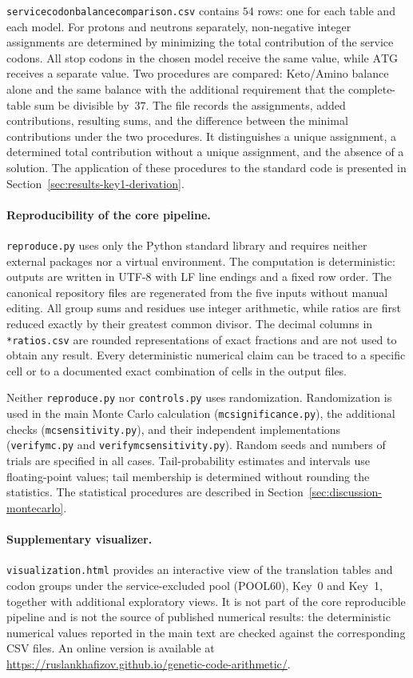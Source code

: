 \documentclass[11pt,a4paper]{article}
\renewcommand{\_}{\origunderscore\allowbreak}
\begin{document}
\texttt{service\_codon\_balance\_comparison.csv} contains
$54$ rows: one for each table and each model.
For protons and neutrons separately, non-negative integer
assignments are determined by minimizing the total
contribution of the service codons. All stop codons
in the chosen model receive the same value,
while $\mathrm{ATG}$ receives a separate value.
Two procedures are compared: Keto/Amino balance alone
and the same balance with the additional requirement
that the complete-table sum be divisible by~$37$.
The file records the assignments, added contributions,
resulting sums, and the difference between the minimal
contributions under the two procedures. It distinguishes
a unique assignment, a determined total contribution
without a unique assignment, and the absence of a solution.
The application of these procedures to the standard code
is presented in Section~\ref{sec:results-key1-derivation}.

\paragraph{Reproducibility of the core pipeline.}
\texttt{reproduce.py} uses only the Python standard library and
requires neither external packages nor a virtual environment. The
computation is deterministic: outputs are written in UTF-8 with LF
line endings and a fixed row order. The canonical repository files
are regenerated from the five inputs without manual editing. All
group sums and residues use integer arithmetic, while ratios are first
reduced exactly by their greatest common divisor. The decimal columns
in \texttt{*\_ratios.csv} are rounded representations of exact
fractions and are not used to obtain any result. Every deterministic
numerical claim can be traced to a specific cell or to a documented
exact combination of cells in the output files.

Neither \texttt{reproduce.py} nor \texttt{controls.py} uses
randomization. Randomization is used in the main Monte Carlo
calculation (\texttt{mc\_significance.py}), the additional checks
(\texttt{mc\_sensitivity.py}), and their independent
implementations (\texttt{verify\_mc.py} and
\texttt{verify\_mc\_sensitivity.py}).
Random seeds and numbers of trials are specified in all cases.
Tail-probability estimates and intervals use floating-point values;
tail membership is determined without rounding the statistics.
The statistical procedures are described in
Section~\ref{sec:discussion-montecarlo}.

\paragraph{Supplementary visualizer.}
\texttt{visualization.html} provides an interactive view of the
translation tables and codon groups under the service-excluded pool
(POOL60), Key~0 and Key~1, together with additional exploratory
views. It is not part of the core reproducible pipeline and is not
the source of published numerical results: the deterministic
numerical values reported in the main text are checked against the
corresponding CSV files. An online
version is available at
\url{https://ruslankhafizov.github.io/genetic-code-arithmetic/}.
\end{document}
